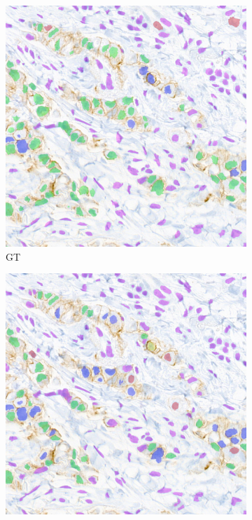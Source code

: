 \begin{figure}[H]
  \centering
  \begin{subfigure}[b]{0.45\textwidth}
    \includegraphics[width=\textwidth]{imgs/qual/breast/gt2.overlay.png}
    \caption{GT}
    \label{fig:breast-gt2}
  \end{subfigure}
  \hfill
  \begin{subfigure}[b]{0.45\textwidth}
    \includegraphics[width=\textwidth]{imgs/qual/breast/hov2.png}

\end{subfigure}
\end{figure}
